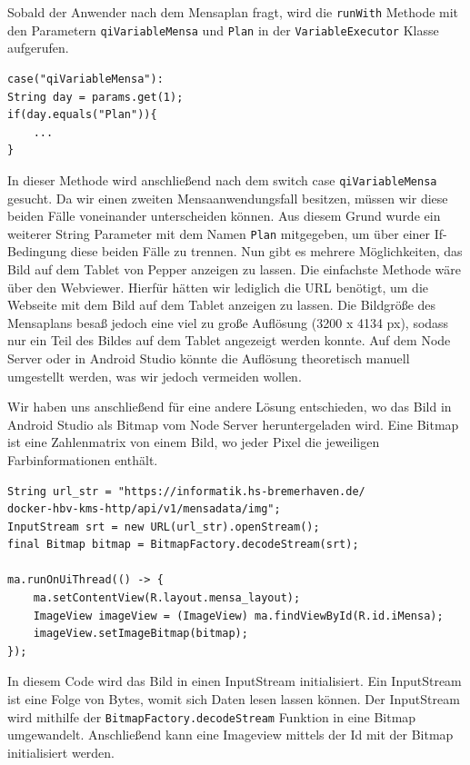 Sobald der Anwender nach dem Mensaplan fragt, wird die \verb|runWith| Methode mit den Parametern \verb|qiVariableMensa| 
und \verb|Plan| in der \verb|VariableExecutor| Klasse aufgerufen.\\

\begin{lstlisting}
case("qiVariableMensa"):
String day = params.get(1);
if(day.equals("Plan")){
    ...
}
\end{lstlisting}

In dieser Methode wird anschließend nach dem switch 
case \verb|qiVariableMensa| gesucht. Da wir einen zweiten Mensaanwendungsfall besitzen, müssen wir diese beiden Fälle 
voneinander unterscheiden können. Aus diesem Grund wurde ein weiterer String Parameter mit dem Namen \verb|Plan| mitgegeben, 
um über einer If-Bedingung diese beiden Fälle zu trennen. 
Nun gibt es mehrere Möglichkeiten, das Bild auf dem Tablet von Pepper anzeigen zu lassen. Die 
einfachste Methode wäre über den Webviewer. Hierfür hätten wir lediglich die URL benötigt, um die Webseite mit dem Bild auf dem 
Tablet anzeigen zu lassen. Die Bildgröße des Mensaplans besaß jedoch eine viel zu große Auflösung (3200 x 4134 px), sodass nur ein Teil des Bildes auf dem Tablet angezeigt werden konnte.
Auf dem Node Server oder in Android Studio könnte die Auflösung theoretisch manuell umgestellt werden, was wir jedoch vermeiden wollen. 

Wir haben uns anschließend für eine andere Lösung entschieden, wo das Bild in Android Studio als Bitmap vom Node Server heruntergeladen wird. Eine Bitmap 
ist eine Zahlenmatrix von einem Bild, wo jeder Pixel die jeweiligen Farbinformationen enthält.\\


\begin{lstlisting}
String url_str = "https://informatik.hs-bremerhaven.de/
docker-hbv-kms-http/api/v1/mensadata/img";
InputStream srt = new URL(url_str).openStream();
final Bitmap bitmap = BitmapFactory.decodeStream(srt);
    
ma.runOnUiThread(() -> {
    ma.setContentView(R.layout.mensa_layout);
    ImageView imageView = (ImageView) ma.findViewById(R.id.iMensa);
    imageView.setImageBitmap(bitmap);
});
\end{lstlisting}

In diesem Code wird das Bild in einen InputStream initialisiert. Ein InputStream ist eine Folge von Bytes, womit sich Daten lesen 
lassen können. Der InputStream wird mithilfe der \verb|BitmapFactory.decodeStream| Funktion in eine Bitmap umgewandelt. 
Anschließend kann eine Imageview mittels der Id mit der Bitmap initialisiert werden. 

